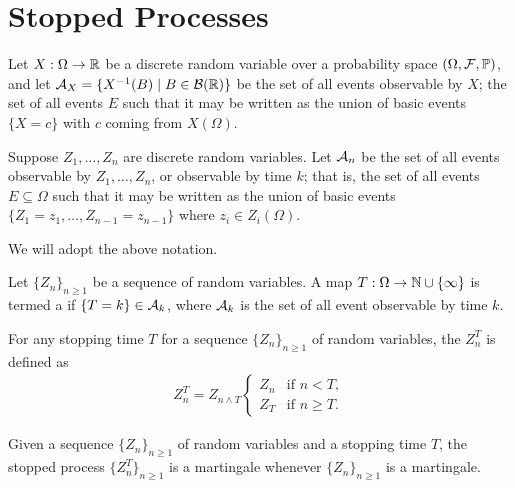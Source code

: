 \section{Stopped Processes}
Let $X:\Omega \to \mathbb{R}$ be a discrete random variable over a probability space $(\Omega,\mathcal{F},\mathbb{P})$, and let $\mathcal{A}_{X} = \{X^{-1}(B) \mid B \in \mathcal{B}(\mathbb{R})\}$ be the set of all events observable by $X$; the set of all events $E$ such that it may be written as the union of basic events $\{X = c\}$ with $c$ coming from $X(\Omega)$.

Suppose $Z_{1},\ldots,Z_{n}$ are discrete random variables. Let $\mathcal{A}_{n}$ be the set of all events observable by $Z_{1},\ldots,Z_{n}$, or observable by time $k$; that is, the set of all events $E \subseteq \Omega$ such that it may be written as the union of basic events $\{Z_{1}=z_{1},\ldots,Z_{n-1}=z_{n-1}\}$ where $z_{i} \in Z_{i}(\Omega)$.

We will adopt the above notation.

\begin{definition}
    Let $\{Z_{n}\}_{n \geq 1}$ be a sequence of random variables. A map $T: \Omega \to \mathbb{N} \cup \{\infty\}$ is termed a  if $\{T=k\} \in \mathcal{A}_{k}$, where $\mathcal{A}_{k}$ is the set of all event observable by time $k$.
\end{definition}

\begin{definition}
    For any stopping time $T$ for a sequence $\{Z_{n}\}_{n \geq 1}$ of random variables, the  $Z_{n}^{T}$ is defined as
    \begin{align}
        Z_{n}^{T} = Z_{n \wedge T} \begin{cases}
            Z_{n} &\text{if } n < T,\\
            Z_{T} &\text{if } n \geq T.
        \end{cases}
    \end{align}
\end{definition}

\begin{theorem}
    Given a sequence $\{Z_{n}\}_{n \geq 1}$ of random variables and a stopping time $T$, the stopped process $\{Z_{n}^{T}\}_{n \geq 1}$ is a martingale whenever $\{Z_{n}\}_{n \geq 1}$ is a martingale.
\end{theorem}

